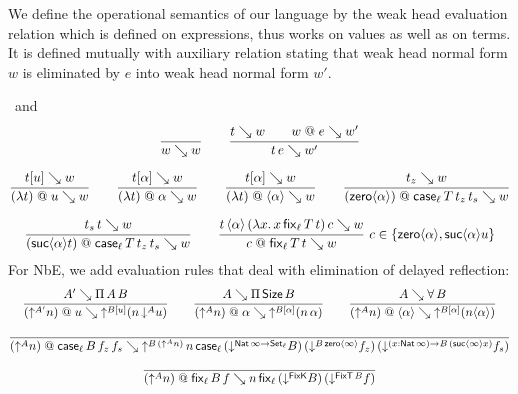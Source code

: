 \documentclass[acmsmall,screen]{acmart}\settopmatter{}
\begin{document}
We define the operational semantics of our language by the weak head
evaluation relation  which is defined on
expressions, thus works on values as well as on terms.  It is defined mutually
with auxiliary relation  stating that weak
head normal form $w$ is eliminated by $e$ into weak head normal form $w'$.

\noindent
{}
\ and \
\vspace{-6ex}
\begin{gather*}
  \ru{}{w \evalsto w}
\qquad
  \ru{t \evalsto w \qquad w \at e \evalsto w'}{t\,e \evalsto w'}
\\[1.5ex]
  \ru{t[u] \evalsto w
    }{(\lambda t) \at u \evalsto w}
\qquad
  \ru{t[\alpha] \evalsto w
    }{(\lambda t) \at \alpha \evalsto w}
\qquad
  \ru{t[\alpha] \evalsto w
    }{(\lambda t) \at \ann \alpha \evalsto w}
\qquad
  \ru{t_z \evalsto w
    }{(\zero \alpha) \at \casett \evalsto w}
\\[1.5ex]
  \ru{t_s\, t \evalsto w
    }{(\suc \alpha t) \at \casett \evalsto w}
\qquad
  \rux{t\,\ann \alpha\,(\lambda x.\, x\, \fixtt)\,c \evalsto w
     }{c \at \fixtt \evalsto w
     }{c\in \{ \zero \alpha, \suc \alpha u \}}
\end{gather*}
For NbE, we add evaluation rules that deal with elimination of delayed reflection:
\begin{gather*}
  \ru{A' \evalsto \piT A B
    }{(\up {A'} n) \at u \evalsto \up{B[u]} (n \, \down A u) }
\qquad
  \ru{A \evalsto \piT \Size B
    }{(\up {A} n) \at \alpha \evalsto \up{B[\alpha]} (n \, \alpha)}
\qquad
  \ru{A \evalsto \forallT B
    }{(\up {A} n) \at \ann \alpha \evalsto \up{B[\alpha]} (n \ann \alpha)}
\\[1.2ex]
  \ru{%
    }{(\up {A} n) \at \case[\ell] B {f_z} {f_s} \evalsto
      \up{B\,(\up{A} n)}\,
         n\,\case[\ell]
             {(\down {\Nat \infty \to \Set[\ell]} B)}
             {(\down {B\,{\zero\infty}} f_z)}
             {(\down {\funS x {\Nat \infty} B\,(\suc \infty x)} f_s)}
    }
\\[1ex]
  \ru{%
    }{(\up {A} n) \at \fix[\ell] B f \evalsto
      n\,\fix[\ell] {(\down {\FixK} B)} {(\down {\FixT\, B} f)}
    }
\end{gather*}
\end{document}
